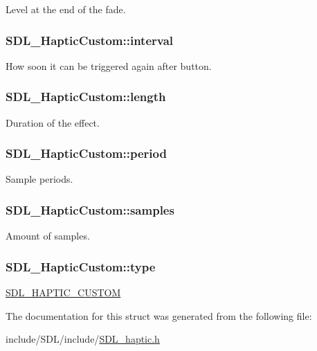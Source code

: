 Level at the end of the fade. \hypertarget{struct_s_d_l___haptic_custom_afdeb26b1709254545e00a59a0a6c360c}{
\subsubsection[{interval}]{ S\-D\-L\-\_\-\-Haptic\-Custom\-::interval}}\label{struct_s_d_l___haptic_custom_afdeb26b1709254545e00a59a0a6c360c}
How soon it can be triggered again after button. \hypertarget{struct_s_d_l___haptic_custom_ad70e8bc2cff74b99d704a757c16b363f}{
\subsubsection[{length}]{ S\-D\-L\-\_\-\-Haptic\-Custom\-::length}}\label{struct_s_d_l___haptic_custom_ad70e8bc2cff74b99d704a757c16b363f}
Duration of the effect. \hypertarget{struct_s_d_l___haptic_custom_aba7fafa808e90baddef25f009b8f4817}{
\subsubsection[{period}]{ S\-D\-L\-\_\-\-Haptic\-Custom\-::period}}\label{struct_s_d_l___haptic_custom_aba7fafa808e90baddef25f009b8f4817}
Sample periods. \hypertarget{struct_s_d_l___haptic_custom_a5905ea1b6182da846535ca8c80b4fa33}{
\subsubsection[{samples}]{ S\-D\-L\-\_\-\-Haptic\-Custom\-::samples}}\label{struct_s_d_l___haptic_custom_a5905ea1b6182da846535ca8c80b4fa33}
Amount of samples. \hypertarget{struct_s_d_l___haptic_custom_a98a8995c94492069dc007502ed97eed2}{
\subsubsection[{type}]{ S\-D\-L\-\_\-\-Haptic\-Custom\-::type}}\label{struct_s_d_l___haptic_custom_a98a8995c94492069dc007502ed97eed2}
\hyperlink{_s_d_l__haptic_8h_a8a18c4de1076ac9bebd718329d16db29}{S\-D\-L\-\_\-\-H\-A\-P\-T\-I\-C\-\_\-\-C\-U\-S\-T\-O\-M} 

The documentation for this struct was generated from the following file\-:\begin{DoxyCompactItemize}
\item 
include/\-S\-D\-L/include/\hyperlink{_s_d_l__haptic_8h}{S\-D\-L\-\_\-haptic.\-h}\end{DoxyCompactItemize}
